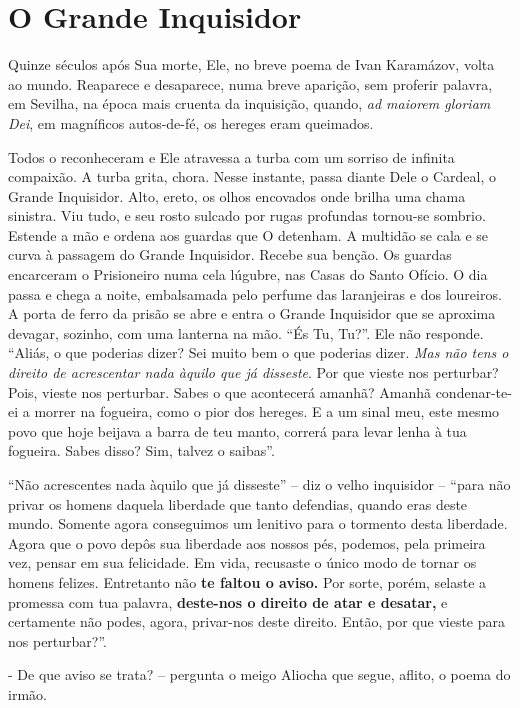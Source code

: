 \section{O Grande Inquisidor}

Quinze séculos após Sua morte, Ele, no breve poema de Ivan Karamázov,
volta ao mundo. Reaparece e desaparece, numa breve aparição, sem
proferir palavra, em Sevilha, na época mais cruenta da inquisição,
quando, \emph{ad maiorem gloriam Dei}, em magníficos autos-de-fé, os
hereges eram queimados.

Todos o reconheceram e Ele atravessa a turba com um sorriso de infinita
compaixão. A turba grita, chora. Nesse instante, passa diante Dele o
Cardeal, o Grande Inquisidor. Alto, ereto, os olhos encovados onde
brilha uma chama sinistra. Viu tudo, e seu rosto sulcado por rugas
profundas tornou-se sombrio. Estende a mão e ordena aos guardas que O
detenham. A multidão se cala e se curva à passagem do Grande Inquisidor.
Recebe sua benção. Os guardas encarceram o Prisioneiro numa cela
lúgubre, nas Casas do Santo Ofício. O dia passa e chega a noite,
embalsamada pelo perfume das laranjeiras e dos loureiros. A porta de
ferro da prisão se abre e entra o Grande Inquisidor que se aproxima
devagar, sozinho, com uma lanterna na mão. ``És Tu, Tu?''. Ele não
responde. ``Aliás, o que poderias dizer? Sei muito bem o que poderias
dizer. \emph{Mas não tens o direito de acrescentar nada àquilo que já
disseste}. Por que vieste nos perturbar? Pois, vieste nos perturbar.
Sabes o que acontecerá amanhã? Amanhã condenar-te-ei a morrer na
fogueira, como o pior dos hereges. E a um sinal meu, este mesmo povo que
hoje beijava a barra de teu manto, correrá para levar lenha à tua
fogueira. Sabes disso? Sim, talvez o saibas''.

``Não acrescentes nada àquilo que já disseste'' -- diz o velho
inquisidor -- ``para não privar os homens daquela liberdade que tanto
defendias, quando eras deste mundo. Somente agora conseguimos um
lenitivo para o tormento desta liberdade. Agora que o povo depôs sua
liberdade aos nossos pés, podemos, pela primeira vez, pensar em sua
felicidade. Em vida, recusaste o único modo de tornar os homens felizes.
Entretanto não \textbf{te faltou o aviso.} Por sorte, porém, selaste a
promessa com tua palavra, \textbf{deste-nos o direito de atar e
desatar,} e certamente não podes, agora, privar-nos deste direito.
Então, por que vieste para nos perturbar?''.

- De que aviso se trata? -- pergunta o meigo Aliocha que segue, aflito,
o poema do irmão.

